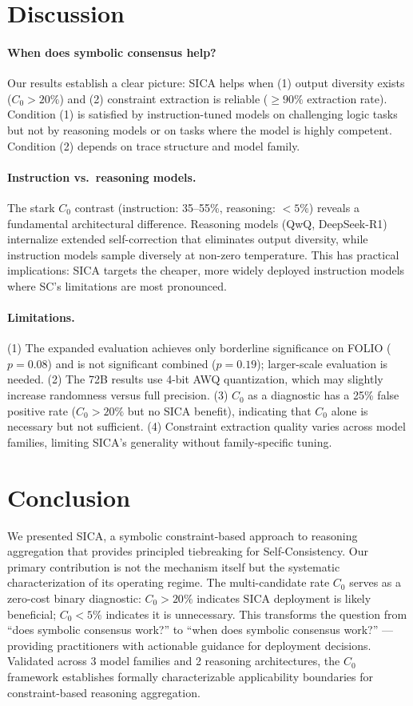 \documentclass[11pt]{article}
\begin{document}
\section{Discussion}

\paragraph{When does symbolic consensus help?} Our results establish a clear picture: SICA helps when (1) output diversity exists ($C_0 > 20\%$) and (2) constraint extraction is reliable ($\geq 90\%$ extraction rate). Condition (1) is satisfied by instruction-tuned models on challenging logic tasks but not by reasoning models or on tasks where the model is highly competent. Condition (2) depends on trace structure and model family.

\paragraph{Instruction vs.\ reasoning models.} The stark $C_0$ contrast (instruction: 35--55\%, reasoning: $<5\%$) reveals a fundamental architectural difference. Reasoning models (QwQ, DeepSeek-R1) internalize extended self-correction that eliminates output diversity, while instruction models sample diversely at non-zero temperature. This has practical implications: SICA targets the cheaper, more widely deployed instruction models where SC's limitations are most pronounced.

\paragraph{Limitations.} (1) The expanded evaluation achieves only borderline significance on FOLIO ($p = 0.08$) and is not significant combined ($p = 0.19$); larger-scale evaluation is needed. (2) The 72B results use 4-bit AWQ quantization, which may slightly increase randomness versus full precision. (3) $C_0$ as a diagnostic has a 25\% false positive rate ($C_0 > 20\%$ but no SICA benefit), indicating that $C_0$ alone is necessary but not sufficient. (4) Constraint extraction quality varies across model families, limiting SICA's generality without family-specific tuning.

\section{Conclusion}

We presented SICA, a symbolic constraint-based approach to reasoning aggregation that provides principled tiebreaking for Self-Consistency. Our primary contribution is not the mechanism itself but the systematic characterization of its operating regime. The multi-candidate rate $C_0$ serves as a zero-cost binary diagnostic: $C_0 > 20\%$ indicates SICA deployment is likely beneficial; $C_0 < 5\%$ indicates it is unnecessary. This transforms the question from ``does symbolic consensus work?'' to ``when does symbolic consensus work?'' --- providing practitioners with actionable guidance for deployment decisions. Validated across 3 model families and 2 reasoning architectures, the $C_0$ framework establishes formally characterizable applicability boundaries for constraint-based reasoning aggregation.
\end{document}
